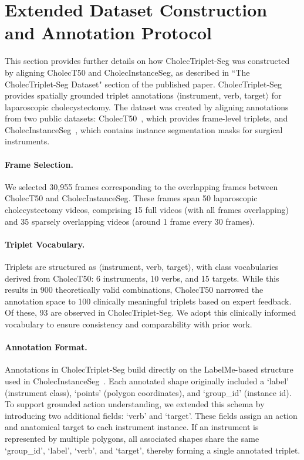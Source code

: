 ﻿\section{Extended Dataset Construction and Annotation Protocol}
This section provides further details on how CholecTriplet-Seg was constructed by aligning CholecT50 and CholecInstanceSeg, as described in ``The CholecTriplet-Seg Dataset" section of the published paper. CholecTriplet-Seg provides spatially grounded triplet annotations $\langle$instrument, verb, target$\rangle$ for laparoscopic cholecystectomy. The dataset was created by aligning annotations from two public datasets: CholecT50~\cite{NWOYE2022102433_rendevous}, which provides frame-level triplets, and CholecInstanceSeg~\cite{cholecinstanceseg}, which contains instance segmentation masks for surgical instruments.

\paragraph{Frame Selection.}  
We selected 30,955 frames corresponding to the overlapping frames between CholecT50 and CholecInstanceSeg. These frames span 50 laparoscopic cholecystectomy videos, comprising 15 full videos (with all frames overlapping) and 35 sparsely overlapping videos (around 1 frame every 30 frames). 


\paragraph{Triplet Vocabulary.}
Triplets are structured as $\langle$instrument, verb, target$\rangle$, with class vocabularies derived from CholecT50: 6 instruments, 10 verbs, and 15 targets. While this results in 900 theoretically valid combinations, CholecT50 narrowed the annotation space to 100 clinically meaningful triplets based on expert feedback. Of these, 93 are observed in CholecTriplet-Seg. We adopt this clinically informed vocabulary to ensure consistency and comparability with prior work.

\paragraph{Annotation Format.}
Annotations in CholecTriplet-Seg build directly on the LabelMe-based structure used in CholecInstanceSeg~\cite{cholecinstanceseg}. Each annotated shape originally included a `label' (instrument class), `points' (polygon coordinates), and `group\_id' (instance id). To support grounded action understanding, we extended this schema by introducing two additional fields: `verb' and `target'. These fields assign an action and anatomical target to each instrument instance. If an instrument is represented by multiple polygons, all associated shapes share the same `group\_id', `label', `verb', and `target', thereby forming a single annotated triplet.


